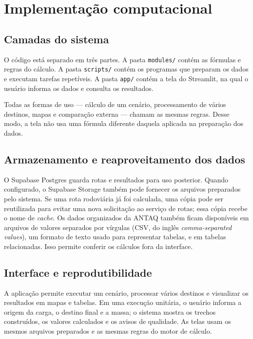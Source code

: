 \documentclass[12pt,a4paper]{report}
\begin{document}
\chapter{Implementação computacional}
\label{chap:implementacao}

\section{Camadas do sistema}

O código está separado em três partes. A pasta \texttt{modules/} contém as fórmulas e regras do cálculo. A pasta \texttt{scripts/} contém os programas que preparam os dados e executam tarefas repetíveis. A pasta \texttt{app/} contém a tela do Streamlit, na qual o usuário informa os dados e consulta os resultados.

Todas as formas de uso --- cálculo de um cenário, processamento de vários destinos, mapas e comparação externa --- chamam as mesmas regras. Desse modo, a tela não usa uma fórmula diferente daquela aplicada na preparação dos dados.

\section{Armazenamento e reaproveitamento dos dados}

O Supabase Postgres guarda rotas e resultados para uso posterior. Quando configurado, o Supabase Storage também pode fornecer os arquivos preparados pelo sistema. Se uma rota rodoviária já foi calculada, uma cópia pode ser reutilizada para evitar uma nova solicitação ao serviço de rotas; essa cópia recebe o nome de \emph{cache}. Os dados organizados da ANTAQ também ficam disponíveis em arquivos de valores separados por vírgulas (CSV, do inglês \emph{comma-separated values}), um formato de texto usado para representar tabelas, e em tabelas relacionadas. Isso permite conferir os cálculos fora da interface.

\section{Interface e reprodutibilidade}

A aplicação permite executar um cenário, processar vários destinos e visualizar os resultados em mapas e tabelas. Em uma execução unitária, o usuário informa a origem da carga, o destino final e a massa; o sistema mostra os trechos construídos, os valores calculados e os avisos de qualidade. As telas usam os mesmos arquivos preparados e as mesmas regras do motor de cálculo.
\end{document}
